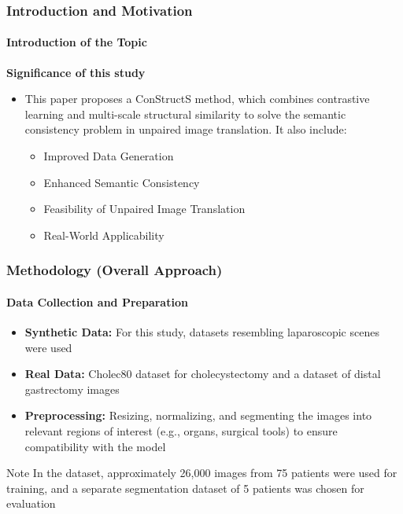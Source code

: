 \documentclass[aspectratio=169, lecture, amberg]{OTHAWbeamer}
\begin{document}
\begin{frame}[t]
    \frametitle{Introduction and Motivation}
    \framesubtitle{Introduction of the Topic}
    
    \vspace{0.1cm} %
    \textbf{Significance of this study}
    \begin{itemize}
        
            \item This paper proposes a ConStructS method, which combines contrastive learning and multi-scale structural similarity to solve the semantic consistency problem in unpaired image translation. It also include:
            \vspace{0.3cm}
        \begin{itemize}
            \item Improved Data Generation
            \vspace{0.4cm}
            \item Enhanced Semantic Consistency
            \vspace{0.4cm}
            \item Feasibility of Unpaired Image Translation
            \vspace{0.4cm}
            \item Real-World Applicability
            
            
        \end{itemize}
    \end{itemize}
    
\end{frame}

    
\begin{frame}[t]
    \frametitle{Methodology (Overall Approach)}
    \framesubtitle{Data Collection and Preparation}
    
    \begin{itemize}
        \item \textbf{Synthetic Data:} For this study, datasets resembling laparoscopic scenes were used\footnotemark[1]
        \item \textbf{Real Data:} Cholec80 dataset for cholecystectomy and a dataset of distal gastrectomy images\footnotemark[2]
        \item \textbf{Preprocessing:} Resizing, normalizing, and segmenting the images into relevant regions of interest (e.g., organs, surgical tools) to ensure compatibility with the model
    \end{itemize}
    
    \begin{block}{Note}
        In the dataset, approximately 26,000 images from 75 patients were used for training, and a separate segmentation dataset of 5 patients was chosen for evaluation
         \end{block}
    \vfill %
    
\end{frame}
\end{document}
